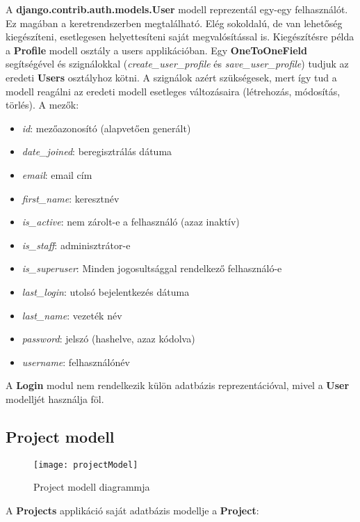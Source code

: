 A \textbf{django.contrib.auth.models.User} modell reprezentál egy-egy felhasználót. Ez magában a keretrendszerben megtalálható. Elég sokoldalú, de van lehetőség kiegészíteni, esetlegesen helyettesíteni saját megvalósítással is. Kiegészítésre példa a \textbf{Profile} modell osztály a users applikációban. Egy \textbf{OneToOneField} segítségével és szignálokkal (\textit{create\_user\_profile} és \textit{save\_user\_profile}) tudjuk az eredeti \textbf{Users} osztályhoz kötni. A szignálok azért szükségesek, mert így tud a modell reagálni az eredeti modell esetleges változásaira (létrehozás, módosítás, törlés). A mezők:

\begin{itemize}
	\item \textit{id}: mezőazonosító (alapvetően generált)
	\item \textit{date\_joined}: beregisztrálás dátuma
	\item \textit{email}: email cím
	\item \textit{first\_name}: keresztnév
	\item \textit{is\_active}: nem zárolt-e a felhasználó (azaz inaktív)
	\item \textit{is\_staff}: adminisztrátor-e
	\item \textit{is\_superuser}: Minden jogosultsággal rendelkező felhasználó-e
	\item \textit{last\_login}: utolsó bejelentkezés dátuma
	\item \textit{last\_name}: vezeték név
	\item \textit{password}: jelszó (hashelve, azaz kódolva)
	\item \textit{username}: felhasználónév
\end{itemize}

A \textbf{Login} modul nem rendelkezik külön adatbázis reprezentációval, mivel a \textbf{User} modelljét használja föl.

\subsection{Project modell}

\begin{figure}[H]
	\centering
	\texttt{[image: projectModel]}
	\caption{Project modell diagrammja}
	\label{fig:projectmodel}
\end{figure}

A \textbf{Projects} applikáció saját adatbázis modellje a \textbf{Project}:


